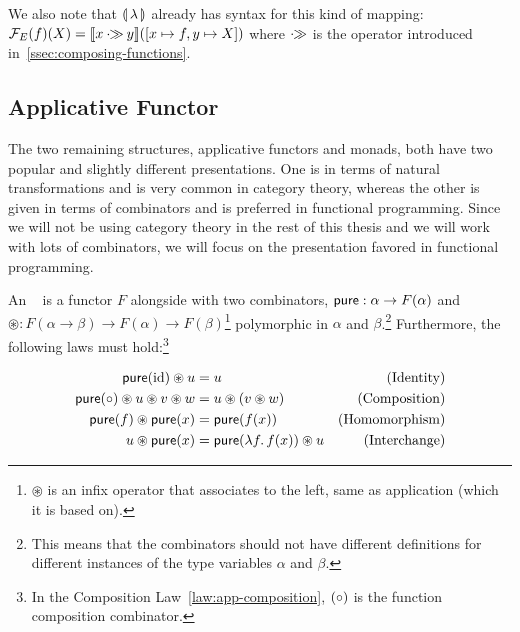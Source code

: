 We also note that $\llparenthesis \, \lambda \, \rrparenthesis$ already has syntax for this kind of
mapping: $\mathcal{F}_E(f)(X) = \llbracket x \mathbin{\cdot\!\!\gg} y \rrbracket([x \mapsto f, y \mapsto X])$ where
$\mathbin{\cdot\!\!\gg}$ is the operator introduced in~\ref{ssec:composing-functions}.


\subsection{Applicative Functor}
\label{ssec:applicative-functor}

The two remaining structures, applicative functors and monads, both have
two popular and slightly different presentations. One is in terms of
natural transformations and is very common in category theory, whereas the
other is given in terms of combinators and is preferred in functional
programming. Since we will not be using category theory in the rest of this
thesis and we will work with lots of combinators, we will focus on the
presentation favored in functional programming.

\pagebreak[4]

\begin{definition}
  An ~\cite{mcbride2008applicative} is a functor
  $F$ alongside with two combinators, $\mathsf{pure} : \alpha \to F(\alpha)$ and
  $\circledast : F(\alpha \to \beta) \to F(\alpha) \to
  F(\beta)$\footnote{$\circledast$ is an infix operator that associates to
    the left, same as application (which it is based on).}  polymorphic in
  $\alpha$ and $\beta$.\footnote{This means that the combinators should not
    have different definitions for different instances of the type
    variables $\alpha$ and $\beta$.} Furthermore, the following laws must
  hold:\footnote{In the Composition Law~\eqref{law:app-composition},
  $({\mathbin{\circ}})$ is the function composition combinator.}

  \begin{align}
    \label{law:app-identity}\mathsf{pure}(\mathrm{id}) \circledast u &= u & \text{(Identity)} \\
    \label{law:app-composition}\mathsf{pure}({\mathbin{\circ}}) \circledast u \circledast v \circledast w &= u \circledast (v \circledast w) & \text{(Composition)} \\
    \label{law:app-homomorphism}\mathsf{pure}(f) \circledast \mathsf{pure}(x) &= \mathsf{pure}(f(x)) & \text{(Homomorphism)} \\
    \label{law:app-interchange}u \circledast \mathsf{pure}(x) &= \mathsf{pure}(\lambda f.\, f(x)) \circledast u & \text{(Interchange)}
  \end{align}
\end{definition}

